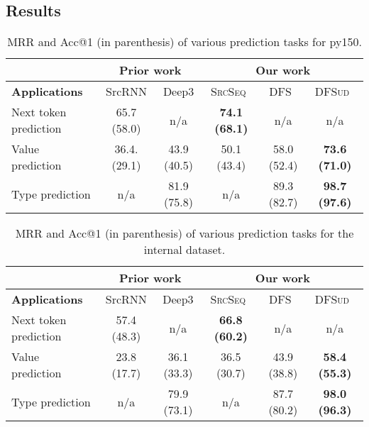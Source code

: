 \documentclass[nonacm, sigconf]{acmart}
\newcommand{\abbr}[1]{\textsc{#1}~}
\newcommand{\SrcSeq}{\abbr{SrcSeq}} \newcommand{\SrcRNN}{\abbr{SrcRNN}} \newcommand{\LeafSeq}{\abbr{LeafSeq}} \newcommand{\RootPath}{\abbr{RootPath}} \newcommand{\LeafTokens}{\abbr{LeafTokens}} \newcommand{\DFS}{\abbr{DFS}} \newcommand{\TreeRel}{\abbr{DFS{ud}}} \newcommand{\TreeReli}{\abbr{DFS{ud+}}}
\begin{document}
\subsection{Results}

\begin{table*}[]
    \centering
    \begin{tabular}{l|cc|ccc}
    \hline
                     & \multicolumn{2}{c}{\textbf{Prior work}} & \multicolumn{3}{c}{\textbf{Our work}} \\
    \hline
      \textbf{Applications}               & SrcRNN & Deep3 & \SrcSeq  & \DFS & \TreeRel  \\
    \hline
  Next token prediction    & 65.7 (58.0)  & n/a   & \textbf{74.1 (68.1)}  & n/a   & n/a             \\
  Value prediction   & 36.4. (29.1)  & 43.9 (40.5)  & 50.1 (43.4)   & 58.0 (52.4) & \textbf{73.6 (71.0)}  \\
  Type prediction     & n/a   & 81.9 (75.8)  & n/a           & 89.3 (82.7)  & \textbf{98.7 (97.6)}  \\
    \hline
    \end{tabular}
    \caption{MRR and Acc@1 (in parenthesis) of various prediction tasks for py150.}
    \label{tab:resultspy150}
\end{table*}


\begin{table*}[]
    \centering
    \begin{tabular}{l|cc|ccc}
    \hline
    & \multicolumn{2}{c}{\textbf{Prior work}} & \multicolumn{3}{c}{\textbf{Our work}} \\
    \hline
    \textbf{Applications} & SrcRNN & Deep3 & \SrcSeq & \DFS        & \TreeRel         \\
\hline
  Next token prediction    & 57.4 (48.3)  & n/a    & \textbf{66.8 (60.2)} & n/a    & n/a     \\
  Value prediction   & 23.8 (17.7)  & 36.1 (33.3)   & 36.5 (30.7)  & 43.9 (38.8)  & \textbf{58.4 (55.3)}   \\
  Type prediction     & n/a   & 79.9 (73.1)   & n/a      & 87.7 (80.2)  & \textbf{98.0 (96.3)}   \\
    \hline
    \end{tabular}
    \caption{MRR and Acc@1 (in parenthesis) of various prediction tasks for the internal dataset.}
    \label{tab:resultsint}
\end{table*}
\end{document}
